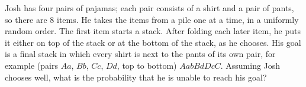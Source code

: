 Josh has four pairs of pajamas; each pair consists of a shirt and a pair of pants, so there are $8$ items. He takes the items from a pile one at a time, in a uniformly random order. The first item starts a stack. After folding each later item, he puts it either on top of the stack or at the bottom of the stack, as he chooses. His goal is a final stack in which every shirt is next to the pants of its own pair, for example (pairs $Aa$, $Bb$, $Cc$, $Dd$, top to bottom) $AabBdDcC$. Assuming Josh chooses well, what is the probability that he is unable to reach his goal?
